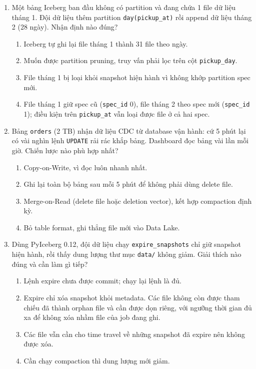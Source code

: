 \documentclass[12pt]{article}
\begin{document}
\begin{enumerate}[label=\textbf{\arabic*.}, leftmargin=1.6em, itemsep=1.2em]
\item Một bảng Iceberg ban đầu không có partition và đang chứa 1 file dữ liệu tháng 1. Đội dữ liệu thêm partition \texttt{day(pickup\_at)} rồi append dữ liệu tháng 2 (28 ngày). Nhận định nào đúng?

\begin{enumerate}[label=\alph*), leftmargin=2.2em, itemsep=1pt]
    \item Iceberg tự ghi lại file tháng 1 thành 31 file theo ngày.
    \item Muốn được partition pruning, truy vấn phải lọc trên cột \texttt{pickup\_day}.
    \item File tháng 1 bị loại khỏi snapshot hiện hành vì không khớp partition spec mới.
    \item File tháng 1 giữ spec cũ (\texttt{spec\_id} 0), file tháng 2 theo spec mới (\texttt{spec\_id} 1); điều kiện trên \texttt{pickup\_at} vẫn loại được file ở cả hai spec.
\end{enumerate}

\item Bảng \texttt{orders} (2 TB) nhận dữ liệu CDC từ database vận hành: cứ 5 phút lại có vài nghìn lệnh \texttt{UPDATE} rải rác khắp bảng. Dashboard đọc bảng vài lần mỗi giờ. Chiến lược nào phù hợp nhất?

\begin{enumerate}[label=\alph*), leftmargin=2.2em, itemsep=1pt]
    \item Copy-on-Write, vì đọc luôn nhanh nhất.
    \item Ghi lại toàn bộ bảng sau mỗi 5 phút để không phải dùng delete file.
    \item Merge-on-Read (delete file hoặc deletion vector), kết hợp compaction định kỳ.
    \item Bỏ table format, ghi thẳng file mới vào Data Lake.
\end{enumerate}

\item Dùng PyIceberg 0.12, đội dữ liệu chạy \texttt{expire\_snapshots} chỉ giữ snapshot hiện hành, rồi thấy dung lượng thư mục \texttt{data/} không giảm. Giải thích nào đúng và cần làm gì tiếp?

\begin{enumerate}[label=\alph*), leftmargin=2.2em, itemsep=1pt]
    \item Lệnh expire chưa được commit; chạy lại lệnh là đủ.
    \item Expire chỉ xóa snapshot khỏi metadata. Các file không còn được tham chiếu đã thành orphan file và cần được dọn riêng, với ngưỡng thời gian đủ xa để không xóa nhầm file của job đang ghi.
    \item Các file vẫn cần cho time travel về những snapshot đã expire nên không được xóa.
    \item Cần chạy compaction thì dung lượng mới giảm.
\end{enumerate}


\end{enumerate}
\end{document}

